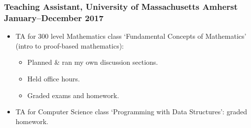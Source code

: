 \documentclass{article}
\begin{document}
		\subsubsection*{Teaching Assistant, University of Massachusetts Amherst \hfill \normalfont \normalsize January--December 2017}
			\begin{itemize}[noitemsep,leftmargin=40pt]
			\item TA for 300 level Mathematics class `Fundamental Concepts of Mathematics' (intro to proof-based mathematics):
			\begin{itemize}
				\item Planned \& ran my own discussion sections.
				\item Held office hours.
				\item Graded exams and homework.
			\end{itemize}
			\item TA for Computer Science class `Programming with Data Structures': graded homework.
			\end{itemize}
		

\end{document}

